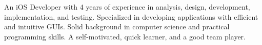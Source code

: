 \documentclass[letter,10pt]{article}
\begin{document}



An iOS Developer with 4 years of experience in analysis, design, development, implementation, and testing. Specialized in developing applications with efficient and intuitive GUIs. Solid background in computer science and practical programming skills. A self-motivated, quick learner, and a good team player.
\end{document}
